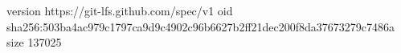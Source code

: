version https://git-lfs.github.com/spec/v1
oid sha256:503ba4ac979c1797ca9d9c4902c96b6627b2ff21dec200f8da37673279c7486a
size 137025
